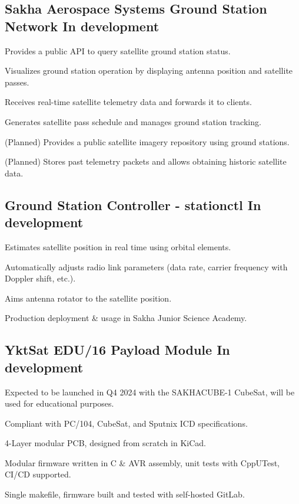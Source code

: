 \documentclass[letter,10pt]{article}
\begin{document}
\subsection{{Sakha Aerospace Systems Ground Station Network \hfill In development}}
\begin{zitemize}
\item Provides a public API to query satellite ground station status.
\item Visualizes ground station operation by displaying antenna position and satellite passes.
\item Receives real-time satellite telemetry data and forwards it to clients.
\item Generates satellite pass schedule and manages ground station tracking.
\item (Planned) Provides a public satellite imagery repository using ground stations.
\item (Planned) Stores past telemetry packets and allows obtaining historic satellite data.
\end{zitemize}

\subsection{{Ground Station Controller - stationctl \hfill In development}}
\begin{zitemize}
\item Estimates satellite position in real time using orbital elements.
\item Automatically adjusts radio link parameters (data rate, carrier frequency with Doppler shift, etc.).
\item Aims antenna rotator to the satellite position.
\item Production deployment \& usage in Sakha Junior Science Academy.
\end{zitemize}

\subsection{{YktSat EDU/16 Payload Module \hfill In development}}
\begin{zitemize}
\item Expected to be launched in Q4 2024 with the SAKHACUBE-1 CubeSat, will be used for educational purposes.
\item Compliant with PC/104, CubeSat, and Sputnix ICD specifications.
\item 4-Layer modular PCB, designed from scratch in KiCad.
\item Modular firmware written in C \& AVR assembly, unit tests with CppUTest, CI/CD supported.
\item Single makefile, firmware built and tested with self-hosted GitLab.
\end{zitemize}
\end{document}
